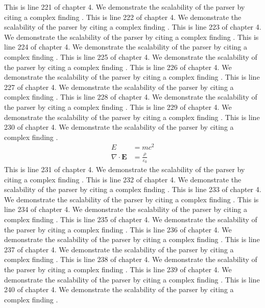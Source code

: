 This is line 221 of chapter 4. We demonstrate the scalability of the parser by citing a complex finding \cite{ref4_221}.
This is line 222 of chapter 4. We demonstrate the scalability of the parser by citing a complex finding \cite{ref4_222}.
This is line 223 of chapter 4. We demonstrate the scalability of the parser by citing a complex finding \cite{ref4_223}.
This is line 224 of chapter 4. We demonstrate the scalability of the parser by citing a complex finding \cite{ref4_224}.
This is line 225 of chapter 4. We demonstrate the scalability of the parser by citing a complex finding \cite{ref4_225}.
This is line 226 of chapter 4. We demonstrate the scalability of the parser by citing a complex finding \cite{ref4_226}.
This is line 227 of chapter 4. We demonstrate the scalability of the parser by citing a complex finding \cite{ref4_227}.
This is line 228 of chapter 4. We demonstrate the scalability of the parser by citing a complex finding \cite{ref4_228}.
This is line 229 of chapter 4. We demonstrate the scalability of the parser by citing a complex finding \cite{ref4_229}.
This is line 230 of chapter 4. We demonstrate the scalability of the parser by citing a complex finding \cite{ref4_230}.
\begin{align*}
  E &= mc^2 \\
  \nabla \cdot \mathbf{E} &= \frac{\rho}{\varepsilon_0}
\end{align*}
This is line 231 of chapter 4. We demonstrate the scalability of the parser by citing a complex finding \cite{ref4_231}.
This is line 232 of chapter 4. We demonstrate the scalability of the parser by citing a complex finding \cite{ref4_232}.
This is line 233 of chapter 4. We demonstrate the scalability of the parser by citing a complex finding \cite{ref4_233}.
This is line 234 of chapter 4. We demonstrate the scalability of the parser by citing a complex finding \cite{ref4_234}.
This is line 235 of chapter 4. We demonstrate the scalability of the parser by citing a complex finding \cite{ref4_235}.
This is line 236 of chapter 4. We demonstrate the scalability of the parser by citing a complex finding \cite{ref4_236}.
This is line 237 of chapter 4. We demonstrate the scalability of the parser by citing a complex finding \cite{ref4_237}.
This is line 238 of chapter 4. We demonstrate the scalability of the parser by citing a complex finding \cite{ref4_238}.
This is line 239 of chapter 4. We demonstrate the scalability of the parser by citing a complex finding \cite{ref4_239}.
This is line 240 of chapter 4. We demonstrate the scalability of the parser by citing a complex finding \cite{ref4_240}.

